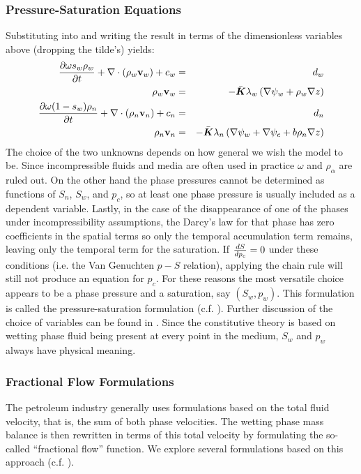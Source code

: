 \documentclass[10pt,dvips,twoside,reqno]{amsart}
\begin{document}
\subsubsection{Pressure-Saturation Equations \label{eq:press_eq}}

Substituting  into  and
writing the result in terms of the dimensionless variables above
(dropping the tilde's) yields:
\begin{eqnarray}
\frac{\partial {\omega s_w \rho_w}}{\partial {t}} + \nabla \cdot \left( \rho_w {\bf v}_w \right) + c_w&=& d_w \label{eq:satPrim} \\
\rho_w {\bf v}_w &=& -\bar{\mbox{{\boldmath ${K}$}}} \lambda_w \left( \nabla \psi_w + \rho_w \nabla z \right)  \\
\frac{\partial {\omega (1-s_w) \rho_n}}{\partial {t}} + \nabla \cdot \left( \rho_n {\bf v}_n \right) + c_n&=& d_n \\
\rho_n {\bf v}_n &=& -\bar{\mbox{{\boldmath ${K}$}}} \lambda_n \left( \nabla \psi_w + \nabla \psi_c + b \rho_n \nabla z \right) \label{eq:qnPrim}
\end{eqnarray}
The choice of the two unknowns depends on how general we wish the
model to be. Since incompressible fluids and media are often used in
practice $\omega$ and $\rho_\alpha$ are ruled out. On the other hand
the phase pressures cannot be determined as functions of $S_n$, $S_w$,
and $p_c$, so at least one phase pressure is usually included as a
dependent variable.  Lastly, in the case of the disappearance of one
of the phases under incompressibility assumptions, the Darcy's law for
that phase has zero coefficients in the spatial terms so only the
temporal accumulation term remains, leaving only the temporal term for
the saturation. If $\frac{d {S}}{d {p_c}}=0$ under these conditions (i.e. the
Van Genuchten $p-S$ relation), applying the chain rule will still not
produce an equation for $p_c$. For these reasons the most versatile
choice appears to be a phase pressure and a saturation, say
$(S_w,p_w)$. This formulation is called the pressure-saturation
formulation (c.f.  \citep{Aziz_Settari_79,Chavent_Jaffre_86,
  Helmig_97}). Further discussion of the choice of variables can be
found in \citep{Kueper_Frind_91,Kees_Miller_02}. Since the
constitutive theory is based on wetting phase fluid being present at
every point in the medium, $S_w$ and $p_w$ always have physical
meaning.

\subsubsection{Fractional Flow Formulations}

The petroleum industry generally uses formulations based on the total
fluid velocity, that is, the sum of both phase velocities. The wetting
phase mass balance is then rewritten in terms of this total velocity
by formulating the so-called ``fractional flow'' function. We explore
several formulations based on this approach (c.f.
\citep{Chavent_Jaffre_86}).
\end{document}
